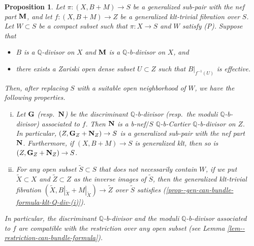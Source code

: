 \documentclass[12pt]{amsart}
\newtheorem{prop}[thm]{Proposition}
\theoremstyle{definition}
\begin{document}
\begin{prop}\label{prop--gen-can-bundle-formula-klt-Q-div}
Let $\pi \colon (X,B+M) \to S$ be a generalized sub-pair with the nef part $\boldsymbol{\rm M}$, and let $f\colon (X,B+M) \to Z$ be a generalized klt-trivial fibration over $S$. 
Let $W \subset S$ be a compact subset such that $\pi \colon X \to S$ and $W$ satisfy (P). 
Suppose that
\begin{itemize}
\item
$B$ is a $\mathbb{Q}$-divisor on $X$ and $\boldsymbol{\rm M}$ is a $\mathbb{Q}$-b-divisor on $X$, and
\item
there exists a Zariski open dense subset $U \subset Z$ such that $B|_{f^{-1}(U)}$ is effective.
\end{itemize}
Then, after replacing $S$ with a suitable open neighborhood of $W$, we have the following properties.
\begin{enumerate}[(i)]
\item \label{prop--gen-can-bundle-formula-klt-Q-div-(i)}
Let $\boldsymbol{\rm G}$ (resp.~$\boldsymbol{\rm N}$) be the discriminant $\mathbb{Q}$-b-divisor (resp.~the moduli $\mathbb{Q}$-b-divisor) associated to $f$. 
Then $\boldsymbol{\rm N}$ is a b-nef$/S$ $\mathbb{Q}$-b-Cartier $\mathbb{Q}$-b-divisor on $Z$. 
In particular, $(Z, \boldsymbol{\rm G}_{Z} +\boldsymbol{\rm N}_{Z}) \to S$ is a generalized sub-pair with the nef part $\boldsymbol{\rm N}$. 
Furthermore, if $(X,B+M) \to S$ is generalized klt, then so is $(Z, \boldsymbol{\rm G}_{Z} +\boldsymbol{\rm N}_{Z}) \to S$. 
\item \label{prop--gen-can-bundle-formula-klt-Q-div-(ii)}
For any open subset $\tilde{S} \subset S$ that does not necessarily contain $W$, if we put $\tilde{X} \subset X$ and $\tilde{Z} \subset Z$ as the inverse images of $\tilde{S}$, then the generalized klt-trivial fibration $(\tilde{X}, B|_{\tilde{X}}+M|_{\tilde{X}}) \to \tilde{Z}$ over $\tilde{S}$ satisfies (\ref{prop--gen-can-bundle-formula-klt-Q-div-(i)}). 
\end{enumerate}
In particular, the discriminant $\mathbb{Q}$-b-divisor and the moduli $\mathbb{Q}$-b-divisor associated to $f$ are compatible with the restriction over any open subset (see Lemma \ref{lem--restriction-can-bundle-formula}). 
\end{prop}
\end{document}
